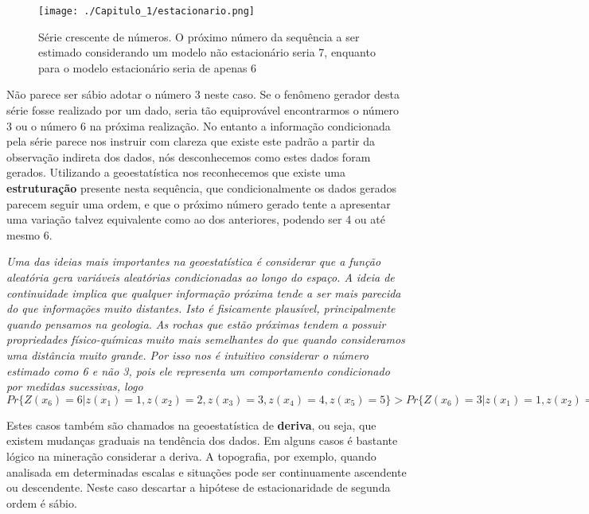 \FloatBarrier
\begin{figure}[!htb]
	\centering
	\texttt{[image: ./Capitulo\_1/estacionario.png]}	
	\caption{Série crescente de números. O próximo número da sequência a ser estimado considerando um modelo não estacionário seria 7, enquanto para o modelo estacionário seria de apenas 6 } 
	\label{nonest}
\end{figure}
\FloatBarrier

Não parece ser sábio adotar o número 3 neste caso. Se o fenômeno gerador desta série fosse realizado por um dado, seria tão equiprovável encontrarmos o número 3 ou o número 6 na próxima realização. No entanto a informação condicionada pela série parece nos instruir com clareza que existe este padrão a partir da observação indireta dos dados, nós desconhecemos como estes dados foram gerados. Utilizando a geoestatística nos reconhecemos que existe uma \textbf{estruturação} presente nesta sequência, que condicionalmente os dados gerados parecem seguir uma ordem, e que o próximo número gerado tente a apresentar uma variação talvez equivalente como ao dos anteriores, podendo ser 4 ou até mesmo 6.

\begin{remark} 
	\textit{Uma das ideias mais importantes na geoestatística é considerar que a função aleatória gera variáveis aleatórias condicionadas ao longo do espaço. A ideia de continuidade implica que qualquer informação próxima tende a ser mais parecida do que informações muito distantes. Isto é fisicamente plausível, principalmente quando pensamos na geologia. As rochas que estão próximas tendem a possuir propriedades físico-químicas muito mais semelhantes do que quando consideramos uma distância muito grande. Por isso nos é intuitivo considerar o número estimado como 6 e não 3, pois ele representa um comportamento condicionado por medidas sucessivas, logo $Pr\{Z(x_{6}) = 6|z(x_{1}) = 1, z(x_{2}) = 2, z(x_{3}) = 3, z(x_{4}) = 4, z(x_{5}) = 5\} >  Pr\{Z(x_{6}) = 3|z(x_{1}) = 1, z(x_{2}) = 2, z(x_{3}) = 3, z(x_{4}) = 4, z(x_{5}) = 5)\}$ }
	
\end{remark}

Estes casos também são chamados na geoestatística de \textbf{deriva}, ou seja, que existem mudanças graduais na tendência dos dados. Em alguns casos é bastante lógico na mineração considerar a deriva. A topografia, por exemplo, quando analisada em determinadas escalas e situações pode ser continuamente ascendente ou descendente. Neste caso descartar a hipótese de estacionaridade de segunda ordem é sábio. 


